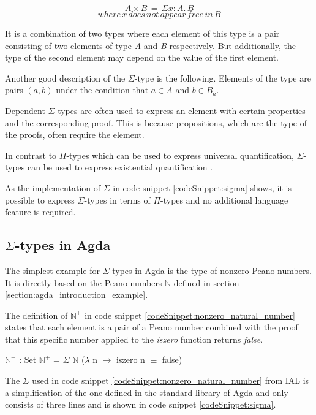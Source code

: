 $$A \times B \,= \,\Sigma x:A. \, B$$
$$where \, x \, does \, not \, appear \, free \, in \, B$$

It is a combination of two types where each element of this type is a pair consisting of two elements of type \emph{A} and \emph{B} respectively.
But additionally, the type of the second element may depend on the value of the first element.

Another good description of the $\Sigma$-type is the following. 
Elements of the type are pairs $(a, b)$ under the condition that $a \in A$ and $b \in B_a$.

Dependent $\Sigma$-types are often used to express an element with certain properties and the corresponding proof.
This is because propositions, which are the type of the proofs, often require the element.

In contrast to $\Pi$-types which can be used to express universal quantification, $\Sigma$-types can be used to express existential quantification \cite{plfa2019}.

As the implementation of $\Sigma$ in code snippet \ref{codeSnippet:sigma} shows, it is possible to express $\Sigma$-types in terms of $\Pi$-types and no additional language feature is required.

\subsection{$\Sigma$-types in Agda}
The simplest example for $\Sigma$-types in Agda is the type of nonzero Peano numbers.
It is directly based on the Peano numbers $\mathbb{N}$ defined in section \ref{section:agda_introduction_example}.

The definition of $\mathbb{N}^+$ in code snippet \ref{codeSnippet:nonzero_natural_number} states that each element is a pair of a Peano number combined with the proof that this specific number applied to the \emph{iszero} function returns \emph{false}.

\begin{codesnippet}[mathescape=true, caption={Definition of nonzero Peano numbers in Agda}, label={codeSnippet:nonzero_natural_number}]
$\mathbb{N}^+$ : Set
$\mathbb{N}^+$ = $\Sigma$ $\mathbb{N}$ ($\lambda$ n $\rightarrow$ iszero n $\equiv$ false)
\end{codesnippet}

The $\Sigma$ used in code snippet \ref{codeSnippet:nonzero_natural_number} from IAL is a simplification of the one defined in the standard library of Agda and only consists of three lines and is shown in code snippet \ref{codeSnippet:sigma}.

